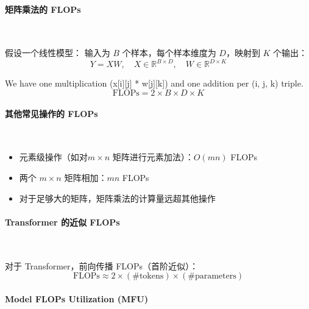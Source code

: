 \paragraph{矩阵乘法的 FLOPs}~{}

假设一个线性模型：  
输入为 \(B\) 个样本，每个样本维度为 \(D\)，映射到 \(K\) 个输出：
\[
Y = X W,\quad X\in\mathbb{R}^{B\times D},\quad W\in\mathbb{R}^{D\times K}
\]

We have one multiplication (x[i][j] * w[j][k]) and one addition per (i, j, k) triple.
\[
\text{FLOPs} = 2 \times B \times D \times K
\]

\paragraph{其他常见操作的 FLOPs}~{}

\begin{itemize}
    \item 元素级操作（如对\(m\times n\) 矩阵进行元素加法）：\(O(mn)\) FLOPs
    \item 两个 \(m\times n\) 矩阵相加：\(mn\)  FLOPs
    \item 对于足够大的矩阵，矩阵乘法的计算量远超其他操作
\end{itemize}

\paragraph{Transformer 的近似 FLOPs}~{}

对于 Transformer，前向传播 FLOPs（首阶近似）：
\[
\text{FLOPs} \approx 2\times (\#\text{tokens})\times (\#\text{parameters})
\]

\paragraph{Model FLOPs Utilization (MFU)}~{}


